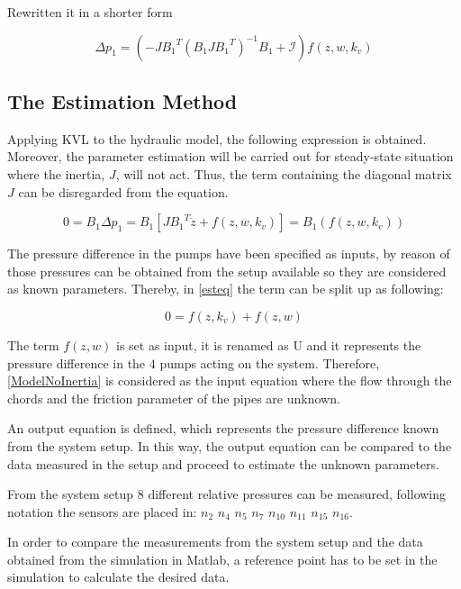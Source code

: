  Rewritten it in a shorter form
 
 \begin{equation}
  \Delta p_1 =  (-J {B_1}^T (B_1 J {B_1}^T)^{-1}B_1 + \mathcal{I}) f(z, w, k_v)
  \label{PressureShort}
 \end{equation}

\subsection{The Estimation Method}
\label{SubSecEstimation}

Applying KVL to the hydraulic model, the following expression is obtained. Moreover, the parameter estimation will be carried out for steady-state 
situation where the inertia, $J$, will not act. Thus, the term containing the diagonal matrix $J$ can be disregarded from the equation. 

\begin{equation}
  0 = B_1 \Delta p_1 = B_1 [ J {B_1}^T \dot{z} + f(z, w, k_v)]  =  B_1 (f(z, w, k_v))
  \label{esteq}
 \end{equation}
 
The pressure difference in the pumps have been specified as inputs, by reason of those pressures can be obtained from the setup available so they are considered 
as known parameters. Thereby, in \eqref{esteq} the term can be split up as following:
 
\begin{equation}
 0 = f(z,k_v)+ f(z,w)
 \label{ModelNoInertia}
\end{equation}

The term $f(z,w)$ is set as input, it is renamed as U and it represents the pressure difference in the $4$ pumps acting on the system. Therefore, 
\eqref{ModelNoInertia} is considered as the input equation where the flow through the chords and the friction parameter of the pipes are unknown. 

An output equation is defined, which represents the pressure difference known from the system setup. In this way, the output equation can be compared 
to the data measured in the setup and proceed to estimate the unknown parameters. 

From the system setup $8$ different relative pressures can be measured, following  notation the sensors are placed in: 
$n_2$ $n_4$ $n_5$ $n_7$ $n_{10}$ $n_{11}$ $n_{15}$ $n_{16}$.

In order to compare the measurements from the system setup and the data obtained from the simulation in Matlab, a reference point has to be set in the 
simulation to calculate the desired data. 

